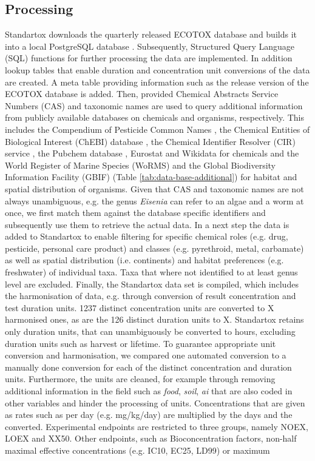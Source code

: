 \documentclass[journal,datadescriptor,accept,moreauthors,pdftex]{Definitions/mdpi}
\begin{document}
\subsection{Processing}
Standartox downloads the quarterly released ECOTOX database and builds it into a local PostgreSQL database \citep{szocs_build_2019}. Subsequently, Structured Query Language (SQL) functions for further processing the data are implemented. In addition lookup tables that enable duration and concentration unit conversions of the data are created. A meta table providing information such as the release version of the ECOTOX database is added. Then, provided Chemical Abstracts Service Numbers (CAS) and taxonomic names are used to query additional information from publicly available databases on chemicals and organisms, respectively. This includes the Compendium of Pesticide Common Names \citep{wood_compendium_2019}, the Chemical Entities of Biological Interest (ChEBI) database \citep{hastings_chebi_2016}, the Chemical Identifier Resolver (CIR) service \citep{nationalinstitutesofhealthnih_chemical_2019}, the Pubchem database \citep{kim_pubchem_2016}, Eurostat \citep{europeancommission_eurostat_2019} and Wikidata \citep{vrandecic_wikidata_2014} for chemicals and the World Register of Marine Species (WoRMS) \citep{wormseditorialboard_world_2018} and the Global Biodiversity Information Facility (GBIF) \citep{gbif_gbif_2019} (Table \ref{tab:data-base-additional}) for habitat and spatial distribution of organisms. Given that CAS and taxonomic names are not always unambiguous, e.g. the genus \textit{Eisenia} can refer to an algae and a worm at once, we first match them against the database specific identifiers and subsequently use them to retrieve the actual data. In a next step the data is added to Standartox to enable filtering for specific chemical roles (e.g. drug, pesticide, personal care product) and classes (e.g. pyrethroid, metal, carbamate) as well as spatial distribution (i.e. continents) and habitat preferences (e.g. freshwater) of individual taxa. Taxa that where not identified to at least genus level are excluded. Finally, the Standartox data set is compiled, which includes the harmonisation of data, e.g. through conversion of result concentration and test duration units. 1237 distinct concentration units are converted to X harmonised ones, as are the 126 distinct duration units to X. Standartox retains only duration units, that can unambiguously be converted to hours, excluding duration units such as harvest or lifetime. To guarantee appropriate unit conversion and harmonisation, we compared one automated conversion to a manually done conversion for each of the distinct concentration and duration units. Furthermore, the units are cleaned, for example through removing additional information in the field such as \textit{food}, \textit{soil}, \textit{ai} that are also coded in other variables and hinder the processing of units. Concentrations that are given as rates such as per day (e.g. mg/kg/day) are multiplied by the days and the converted. Experimental endpoints are restricted to three groups, namely NOEX, LOEX and XX50. Other endpoints, such as Bioconcentration factors, non-half maximal effective concentrations (e.g. IC10, EC25, LD99) or maximum 
\end{document}
